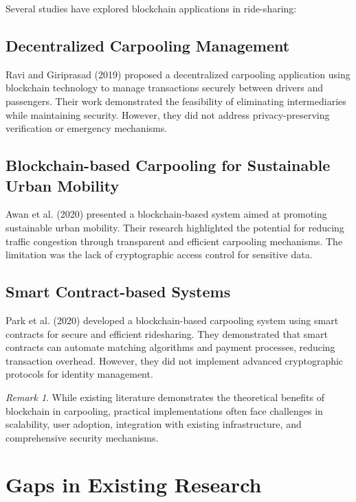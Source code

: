 \documentclass[12pt]{report}
\theoremstyle{plain}
\theoremstyle{definition}
\theoremstyle{remark}
\newtheorem{remark}[theorem]{Remark}
\begin{document}
Several studies have explored blockchain applications in ride-sharing:

\subsection{Decentralized Carpooling Management}

Ravi and Giriprasad (2019) proposed a decentralized carpooling application using blockchain technology to manage transactions securely between drivers and passengers. Their work demonstrated the feasibility of eliminating intermediaries while maintaining security. However, they did not address privacy-preserving verification or emergency mechanisms.

\subsection{Blockchain-based Carpooling for Sustainable Urban Mobility}

Awan et al. (2020) presented a blockchain-based system aimed at promoting sustainable urban mobility. Their research highlighted the potential for reducing traffic congestion through transparent and efficient carpooling mechanisms. The limitation was the lack of cryptographic access control for sensitive data.

\subsection{Smart Contract-based Systems}

Park et al. (2020) developed a blockchain-based carpooling system using smart contracts for secure and efficient ridesharing. They demonstrated that smart contracts can automate matching algorithms and payment processes, reducing transaction overhead. However, they did not implement advanced cryptographic protocols for identity management.

\begin{remark}
While existing literature demonstrates the theoretical benefits of blockchain in carpooling, practical implementations often face challenges in scalability, user adoption, integration with existing infrastructure, and comprehensive security mechanisms.
\end{remark}

\section{Gaps in Existing Research}
\end{document}
